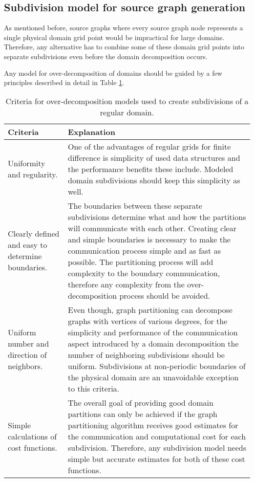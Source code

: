\subsection{Subdivision model for source graph generation}
\label{sec:subdivmodel}
As mentioned before, source graphs where every source graph node represents a single physical domain grid point would be impractical for large domains.
Therefore, any alternative has to combine some of these domain grid points into separate subdivisions even before the domain decomposition occurs.

Any model for over-decomposition of domains should be guided by a few principles described in detail in Table \ref{tab:criteria}.

\begin{table}[!htbp]
\centering
{}
\begin{tabular}{p{4.5cm} p{9.5cm}}
\toprule
Criteria & Explanation \\
\midrule
Uniformity and regularity.
&
One of the advantages of regular grids for finite difference is simplicity of used data structures and the performance benefits these include.
Modeled domain subdivisions should keep this simplicity as well.
\\
Clearly defined and easy to determine boundaries. 
&
The boundaries between these separate subdivisions determine what and how the partitions will communicate with each other.
Creating clear and simple boundaries is necessary to make the communication process simple and as fast as possible.
The partitioning process will add complexity to the boundary communication, therefore any complexity from the over-decomposition process should be avoided.
\\
Uniform number and direction of neighbors.
&
Even though, graph partitioning can decompose graphs with vertices of various degrees, for the simplicity and performance of the communication aspect introduced by a domain decomposition the number of neighboring subdivisions should be uniform. Subdivisions at non-periodic boundaries of the physical domain are an unavoidable exception to this criteria.
\\
Simple calculations of cost functions.
&
The overall goal of providing good domain partitions can only be achieved if the graph partitioning algorithm receives good estimates for the communication and computational cost for each subdivision.
Therefore, any subdivision model needs simple but accurate estimates for both of these cost functions.
\\
\bottomrule
\end{tabular}
\caption{Criteria for over-decomposition models used to create subdivisions of a regular domain.}
\label{tab:criteria}
\end{table}

